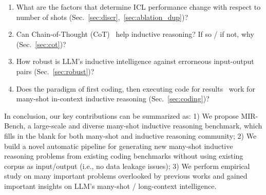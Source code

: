 \begin{enumerate}%
    \item What are the factors that determine ICL performance change with respect to number of shots (Sec.~\ref{sec:discr},~\ref{sec:ablation_dup})?
    \item Can Chain-of-Thought (CoT)~\citep{wei2022chain} help inductive reasoning? If so / if not, why (Sec.~\ref{sec:cot})?
    \item How robust is LLM's inductive intelligence against errorneous input-output pairs (Sec.~\ref{sec:robust})?
    \item Does the paradigm of first coding, then executing code for results~\citep{cheng2024inductive} work for many-shot in-context inductive reasoning (Sec.~\ref{sec:coding})?
\end{enumerate}

In conclusion, our key contributions can be summarized as: 1) We propose MIR-Bench, a large-scale and diverse many-shot inductive reasoning benchmark, which fills in the blank for both many-shot and inductive reasoning community; 2) We build a novel automatic pipeline for generating new many-shot inductive reasoning problems from existing coding benchmarks without using existing corpus as input/output (i.e., no data leakage issues); 3) We perform empirical study on many important problems overlooked by previous works and gained important insights on LLM's many-shot / long-context intelligence.







